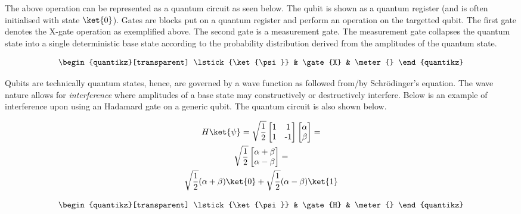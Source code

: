 \documentclass[../main.tex]{subfiles}
\begin{document}
The above operation can be represented as a quantum circuit as seen below. The qubit is shown as a quantum register (and is often initialised with state $\ket{0}$). Gates are blocks put on a quantum register and perform an operation on the targetted qubit. The first gate denotes the X-gate operation as exemplified above. The second gate is a measurement gate. The measurement gate collapses the quantum state into a single deterministic base state according to the probability distribution derived from the amplitudes of the quantum state.

\begin{equation*}
    \begin{quantikz}[transparent]
        \lstick{\ket{\psi}} & \gate{X} & \meter{}
    \end{quantikz}
\end{equation*}

Qubits are technically quantum states, hence, are governed by a wave function as followed from/by Schrödinger's equation. The wave nature allows for \emph{interference} where amplitudes of a base state may constructively or destructively interfere. Below is an example of interference upon using an Hadamard gate on a generic qubit. The quantum circuit is also shown below.

\begin{gather*}
    H\ket{\psi} =  \sqrt{\frac{1}{2}}\begin{bmatrix} 1 & 1 \\ 1 & \text{-}1 \end{bmatrix} \begin{bmatrix}\alpha \\ \beta \end{bmatrix}  = \\ 
    \sqrt{\frac{1}{2}} \begin{bmatrix}\alpha + \beta \\ \alpha - \beta \end{bmatrix} = \\
    \sqrt{\frac{1}{2}}(\alpha + \beta) \ket{0} + \sqrt{\frac{1}{2}}(\alpha - \beta) \ket{1}
\label{eq: gate_h}
\end{gather*}

\begin{equation*}
    \begin{quantikz}[transparent]
        \lstick{\ket{\psi}} & \gate{H} & \meter{}
    \end{quantikz}
\end{equation*}
\end{document}
